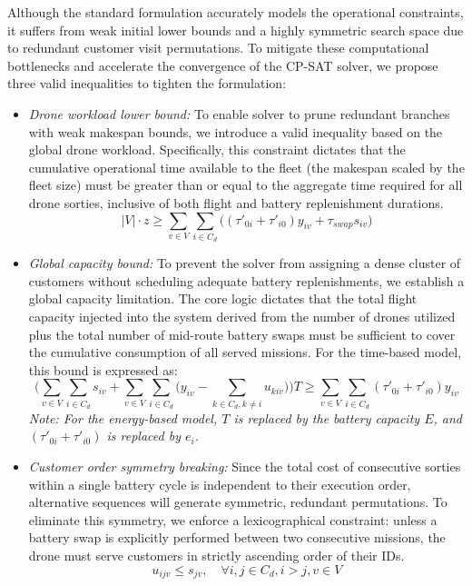 \documentclass[3p, authoryear, 11pt]{elsarticle}
\begin{document}
Although the standard formulation accurately models the operational constraints, it suffers from weak initial lower bounds and a highly symmetric search space due to redundant customer visit permutations. To mitigate these computational bottlenecks and accelerate the convergence of the CP-SAT solver, we propose three valid inequalities to tighten the formulation:

\begin{itemize}
    \item \textit{Drone workload lower bound:} 
    To enable solver to prune redundant branches with weak makespan bounds, we introduce a valid inequality based on the global drone workload. Specifically, this constraint dictates that the cumulative operational time available to the fleet (the makespan scaled by the fleet size) must be greater than or equal to the aggregate time required for all drone sorties, inclusive of both flight and battery replenishment durations.
\begin{equation}
    |V| \cdot z \ge \sum_{v \in V} \sum_{i \in C_d} \Big( (\tau'_{0i} + \tau'_{i0}) y_{iv} + \tau_{swap} s_{iv} \Big)
\end{equation}

    \item \textit{Global capacity bound:} To prevent the solver from assigning a dense cluster of customers without scheduling adequate battery replenishments, we establish a global capacity limitation. The core logic dictates that the total flight capacity injected into the system derived from the number of drones utilized plus the total number of mid-route battery swaps must be sufficient to cover the cumulative consumption of all served missions. For the time-based model, this bound is expressed as:
\begin{equation}
    \Bigg( \sum_{v \in V} \sum_{i \in C_d} s_{iv} + \sum_{v \in V} \sum_{i \in C_d} \Big(y_{iv} - \sum_{k \in C_d, k \neq i} u_{kiv} \Big) \Bigg) T \ge \sum_{v \in V} \sum_{i \in C_d} (\tau'_{0i} + \tau'_{i0}) y_{iv}
\end{equation}
\textit{Note: For the energy-based model, $T$ is replaced by the battery capacity $E$, and $(\tau'_{0i} + \tau'_{i0})$ is replaced by $e_i$.}

    \item \textit{Customer order symmetry breaking:} Since the total cost of consecutive sorties within a single battery cycle is independent to their execution order, alternative sequences will generate symmetric, redundant permutations. To eliminate this symmetry, we enforce a lexicographical constraint: unless a battery swap is explicitly performed between two consecutive missions, the drone must serve customers in strictly ascending order of their IDs.
\begin{equation}
    u_{ijv} \le s_{jv}, \quad \forall i, j \in C_d, i > j, v \in V
\end{equation}

\end{itemize}
\end{document}
